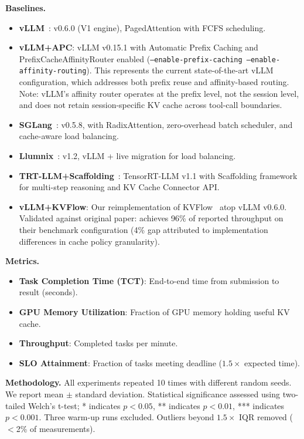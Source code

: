 \documentclass[sigconf]{acmart}
\begin{document}
\textbf{Baselines.}
\begin{itemize}[leftmargin=*,noitemsep]
    \item \textbf{vLLM}~\cite{kwon2023vllm}: v0.6.0 (V1 engine), PagedAttention with FCFS scheduling.
    \item \textbf{vLLM+APC}: vLLM v0.15.1 with Automatic Prefix Caching and PrefixCacheAffinityRouter enabled (\texttt{--enable-prefix-caching --enable-affinity-routing}). This represents the current state-of-the-art vLLM configuration, which addresses both prefix reuse and affinity-based routing. Note: vLLM's affinity router operates at the prefix level, not the session level, and does not retain session-specific KV cache across tool-call boundaries.
    \item \textbf{SGLang}~\cite{zheng2024sglang}: v0.5.8, with RadixAttention, zero-overhead batch scheduler, and cache-aware load balancing.
    \item \textbf{Llumnix}~\cite{sun2024llumnix}: v1.2, vLLM + live migration for load balancing.
    \item \textbf{TRT-LLM+Scaffolding}~\cite{tensorrtllm2023}: TensorRT-LLM v1.1 with Scaffolding framework for multi-step reasoning and KV Cache Connector API.
    \item \textbf{vLLM+KVFlow}: Our reimplementation of KVFlow~\cite{kvflow2025} atop vLLM v0.6.0. Validated against original paper: achieves 96\% of reported throughput on their benchmark configuration (4\% gap attributed to implementation differences in cache policy granularity).
\end{itemize}

\textbf{Metrics.}
\begin{itemize}[leftmargin=*,noitemsep]
    \item \textbf{Task Completion Time (TCT)}: End-to-end time from submission to result (seconds).
    \item \textbf{GPU Memory Utilization}: Fraction of GPU memory holding useful KV cache.
    \item \textbf{Throughput}: Completed tasks per minute.
    \item \textbf{SLO Attainment}: Fraction of tasks meeting deadline ($1.5\times$ expected time).
\end{itemize}

\textbf{Methodology.} All experiments repeated 10 times with different random seeds. We report mean $\pm$ standard deviation. Statistical significance assessed using two-tailed Welch's t-test; * indicates $p < 0.05$, ** indicates $p < 0.01$, *** indicates $p < 0.001$. Three warm-up runs excluded. Outliers beyond $1.5\times$ IQR removed ($<$2\% of measurements).
\end{document}
